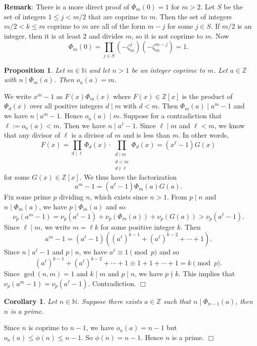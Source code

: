 \documentclass{article}
\def\Z{{\mathbb Z}}
\def\N{{\mathbb N}}
\def\Z{{\mathbb Z}}
\newtheorem{cor}[subsection]{Corollary}
\newtheorem{proposition}[subsection]{Proposition}
\newenvironment{proof}{\noindent {\bf Proof:}}{$\Box$ \vspace{2 ex}}
\begin{document}
\noindent\textbf{Remark}: There is a more direct proof of $\Phi_m(0) = 1$ for $m>2$. Let $S$ be the set of integers $1\leq j < m/2$ that are coprime to $m$. Then the set of integers $m/2 < k \leq m$ coprime to $m$ are all of the form $m - j$ for some $j\in S$. If $m/2$ is an integer, then it is at least $2$ and divides $m$, so it is not coprime to $m$. Now
$$\Phi_m(0) = \prod_{j\in S}(-\zeta_m^j)(-\zeta_m^{m-j}) = 1.$$

\begin{proposition}\label{prop:LTE}
    Let $m\in\N$ and let $n>1$ be an integer coprime to $m$. Let $a\in\Z$ with $n\mid \Phi_m(a)$. Then $o_n(a) = m$.
\end{proposition}

\begin{proof}
    We write $x^m - 1$ as $F(x)\Phi_m(x)$ where $F(x)\in\Z[x]$ is the product of $\Phi_d(x)$ over all positive integers $d\mid m$ with $d<m$. Then $\Phi_m(a)\mid a^m - 1$ and we have $n\mid a^m - 1$. Hence $o_n(a)\mid m$.
    Suppose for a contradiction that $\ell:=o_n(a)<m$. Then we have $n\mid a^\ell - 1$.  Since $\ell\mid m$ and $\ell < m$, we know that any divisor of $\ell$ is a divisor of $m$ and is less than $m$. In other words, $$F(x) = \prod_{d\mid \ell}\Phi_d(x)\cdot\prod_{\substack{d\mid m\\ d<m \\ d\nmid\ell}}\Phi_d(x) = (x^\ell - 1)G(x)$$ for some $G(x)\in\Z[x]$. We thus have the factorization
    $$a^m - 1 = (a^\ell - 1)\Phi_m(a)G(a).$$
    Fix some prime $p$ dividing $n$, which exists since $n>1$. From $p\mid n$ and $n\mid \Phi_m(a)$, we have $p\mid\Phi_m(a)$ and so
    $$\nu_p(a^m - 1) = \nu_p(a^\ell - 1) + \nu_p(\Phi_m(a)) + \nu_p(G(a)) > \nu_p(a^\ell - 1).$$
    Since $\ell\mid m$, we write $m = \ell k$ for some positive integer $k$. Then
    $$a^m - 1 = (a^\ell - 1)((a^\ell)^{k-1} + (a^\ell)^{k-2} + \cdots + 1).$$
    Since $n\mid a^\ell-1$ and $p\mid n$, we have $a^\ell\equiv 1\pmod{p}$ and so
    $$(a^\ell)^{k-1} + (a^\ell)^{k-2} + \cdots + 1 \equiv 1+1+\cdots+1 = k\pmod{p}.$$
    Since $\gcd(n,m) = 1$ and $k\mid m$ and $p\mid n$, we have $p\nmid k$. This implies that $\nu_p(a^m - 1) = \nu_p(a^\ell - 1)$. Contradiction.
\end{proof}

\begin{cor}
    Let $n\in\N$. Suppose there exists $a\in\Z$ such that $n\mid\Phi_{n-1}(a)$, then $n$ is a prime.
\end{cor}

\begin{proof}
    Since $n$ is coprime to $n-1$, we have $o_n(a) = n-1$ but $o_n(a)\leq\phi(n)\leq n - 1$. So $\phi(n) = n - 1$. Hence $n$ is a prime.
\end{proof}
\end{document}
